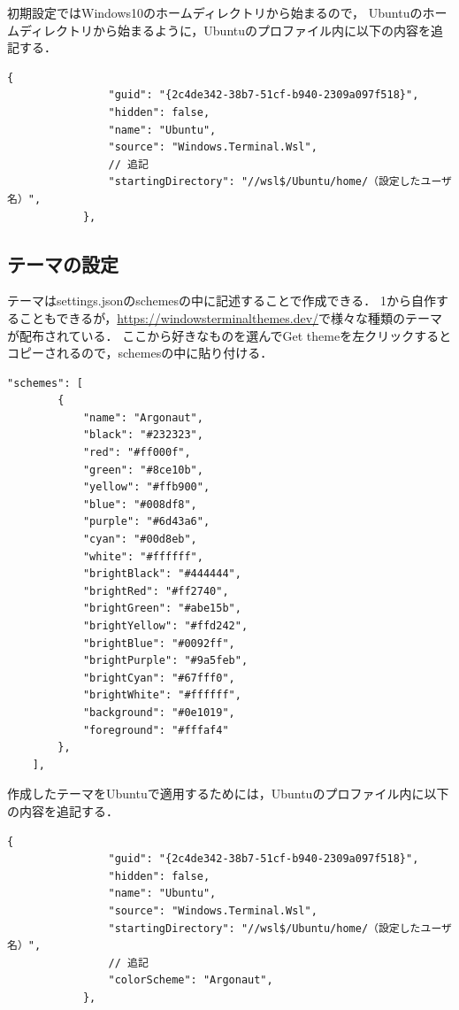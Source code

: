 \documentclass[uplatex]{jsarticle}
\begin{document}
初期設定ではWindows10のホームディレクトリから始まるので，
Ubuntuのホームディレクトリから始まるように，Ubuntuのプロファイル内に以下の内容を追記する．

\vspace{5pt}
\begin{lstlisting}[style=code]
            {
                "guid": "{2c4de342-38b7-51cf-b940-2309a097f518}",
                "hidden": false,
                "name": "Ubuntu",
                "source": "Windows.Terminal.Wsl",
                // 追記
                "startingDirectory": "//wsl$/Ubuntu/home/（設定したユーザ名）",
            },
\end{lstlisting}

\newpage
\subsection{テーマの設定}
テーマはsettings.jsonのschemesの中に記述することで作成できる．
1から自作することもできるが，\url{https://windowsterminalthemes.dev/}で様々な種類のテーマが配布されている．
ここから好きなものを選んでGet themeを左クリックするとコピーされるので，schemesの中に貼り付ける．
\vspace{5pt}
\begin{lstlisting}[style=code]
    "schemes": [
        {
            "name": "Argonaut",
            "black": "#232323",
            "red": "#ff000f",
            "green": "#8ce10b",
            "yellow": "#ffb900",
            "blue": "#008df8",
            "purple": "#6d43a6",
            "cyan": "#00d8eb",
            "white": "#ffffff",
            "brightBlack": "#444444",
            "brightRed": "#ff2740",
            "brightGreen": "#abe15b",
            "brightYellow": "#ffd242",
            "brightBlue": "#0092ff",
            "brightPurple": "#9a5feb",
            "brightCyan": "#67fff0",
            "brightWhite": "#ffffff",
            "background": "#0e1019",
            "foreground": "#fffaf4"
        },
    ],
\end{lstlisting}

作成したテーマをUbuntuで適用するためには，Ubuntuのプロファイル内に以下の内容を追記する．

\vspace{5pt}
\begin{lstlisting}[style=code]
            {
                "guid": "{2c4de342-38b7-51cf-b940-2309a097f518}",
                "hidden": false,
                "name": "Ubuntu",
                "source": "Windows.Terminal.Wsl",
                "startingDirectory": "//wsl$/Ubuntu/home/（設定したユーザ名）",
                // 追記
                "colorScheme": "Argonaut",
            },
\end{lstlisting}
\end{document}
